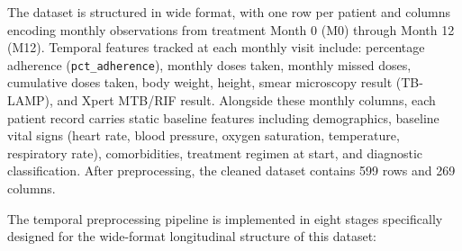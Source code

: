 \documentclass[12pt]{article}
\begin{document}
The dataset is structured in wide format, with one row per patient and columns encoding monthly observations from treatment Month 0 (M0) through Month 12 (M12). Temporal features tracked at each monthly visit include: percentage adherence (\texttt{pct\_adherence}), monthly doses taken, monthly missed doses, cumulative doses taken, body weight, height, smear microscopy result (TB-LAMP), and Xpert MTB/RIF result. Alongside these monthly columns, each patient record carries static baseline features including demographics, baseline vital signs (heart rate, blood pressure, oxygen saturation, temperature, respiratory rate), comorbidities, treatment regimen at start, and diagnostic classification. After preprocessing, the cleaned dataset contains 599 rows and 269 columns.

The temporal preprocessing pipeline is implemented in eight stages specifically designed for the wide-format longitudinal structure of this dataset:
\end{document}
